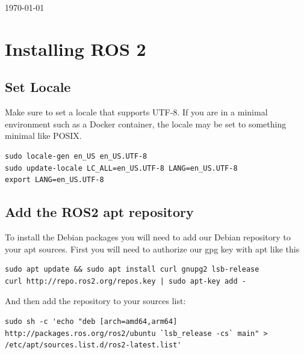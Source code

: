 \documentclass[12pt,a4paper,oneside]{report}
\begin{document}
\begin{titlepage}
	\vspace{15mm}	
	{\large \today}\\[4cm]
	\vfill %
	
\end{titlepage}

\tableofcontents
\newpage
\chapter{Installing ROS 2}

\section{Set Locale}
Make sure to set a locale that supports UTF-8. If you are in a minimal environment such as a Docker container, the locale may be set to something minimal like POSIX.
\begin{lstlisting}
sudo locale-gen en_US en_US.UTF-8
sudo update-locale LC_ALL=en_US.UTF-8 LANG=en_US.UTF-8
export LANG=en_US.UTF-8
\end{lstlisting}

\section{Add the ROS2 apt repository}
To install the Debian packages you will need to add our Debian repository to your apt sources. First you will need to authorize our gpg key with apt like this
\begin{lstlisting}
sudo apt update && sudo apt install curl gnupg2 lsb-release
curl http://repo.ros2.org/repos.key | sudo apt-key add -
\end{lstlisting}
And then add the repository to your sources list:
\begin{lstlisting}
sudo sh -c 'echo "deb [arch=amd64,arm64] http://packages.ros.org/ros2/ubuntu `lsb_release -cs` main" > /etc/apt/sources.list.d/ros2-latest.list'
\end{lstlisting}
\end{document}
